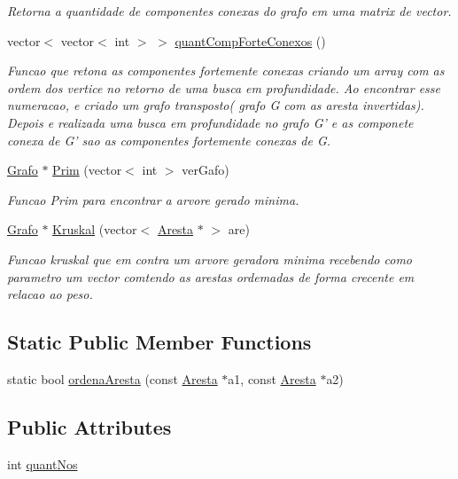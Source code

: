\begin{DoxyCompactItemize}
\begin{DoxyCompactList}\small\item\em Retorna a quantidade de componentes conexas do grafo em uma matrix de vector. \end{DoxyCompactList}\item 
vector$<$ vector$<$ int $>$ $>$ \hyperlink{class_grafo_ab64d335140e23a281f9600b764b6ed80}{quant\-Comp\-Forte\-Conexos} ()
\begin{DoxyCompactList}\small\item\em Funcao que retona as componentes fortemente conexas criando um array com as ordem dos vertice no retorno de uma busca em profundidade. Ao encontrar esse numeracao, e criado um grafo transposto( grafo G com as aresta invertidas). Depois e realizada uma busca em profundidade no grafo G' e as componete conexa de G' sao as componentes fortemente conexas de G. \end{DoxyCompactList}\item 
\hyperlink{class_grafo}{Grafo} $\ast$ \hyperlink{class_grafo_a8d382797529db17eaf6b77cc9c6e1de9}{Prim} (vector$<$ int $>$ ver\-Gafo)
\begin{DoxyCompactList}\small\item\em Funcao Prim para encontrar a arvore gerado minima. \end{DoxyCompactList}\item 
\hyperlink{class_grafo}{Grafo} $\ast$ \hyperlink{class_grafo_a5e15346d9279bebe36bcfe34837a194a}{Kruskal} (vector$<$ \hyperlink{class_aresta}{Aresta} $\ast$ $>$ are)
\begin{DoxyCompactList}\small\item\em Funcao kruskal que em contra um arvore geradora minima recebendo como parametro um vector comtendo as arestas ordemadas de forma crecente em relacao ao peso. \end{DoxyCompactList}\end{DoxyCompactItemize}
\subsection*{Static Public Member Functions}
\begin{DoxyCompactItemize}
\item 
static bool \hyperlink{class_grafo_a5dac1549cdbbc647b8a389df64f50746}{ordena\-Aresta} (const \hyperlink{class_aresta}{Aresta} $\ast$a1, const \hyperlink{class_aresta}{Aresta} $\ast$a2)
\end{DoxyCompactItemize}
\subsection*{Public Attributes}
\begin{DoxyCompactItemize}
\item 
int \hyperlink{class_grafo_a579e844e050120ab0cea14ca32e8735b}{quant\-Nos}
\end{DoxyCompactItemize}


